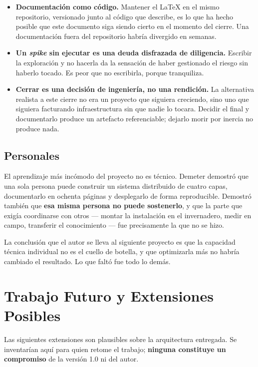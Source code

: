 \begin{itemize}[leftmargin=*, label=--]
    \item \textbf{Documentación como código.} Mantener el LaTeX en el mismo
          repositorio, versionado junto al código que describe, es lo que ha hecho
          posible que este documento siga siendo cierto en el momento del cierre.
          Una documentación fuera del repositorio habría divergido en semanas.
    \item \textbf{Un \textit{spike} sin ejecutar es una deuda disfrazada de
          diligencia.} Escribir la exploración y no hacerla da la sensación de
          haber gestionado el riesgo sin haberlo tocado. Es peor que no escribirla,
          porque tranquiliza.
    \item \textbf{Cerrar es una decisión de ingeniería, no una rendición.} La
          alternativa realista a este cierre no era un proyecto que siguiera
          creciendo, sino uno que siguiera facturando infraestructura sin que nadie
          lo tocara. Decidir el final y documentarlo produce un artefacto
          referenciable; dejarlo morir por inercia no produce nada.
\end{itemize}

\subsection*{Personales}

El aprendizaje más incómodo del proyecto no es técnico. Demeter demostró que una
sola persona puede construir un sistema distribuido de cuatro capas, documentarlo
en ochenta páginas y desplegarlo de forma reproducible. Demostró también que \textbf{esa
misma persona no puede sostenerlo}, y que la parte que exigía coordinarse con
otros --- montar la instalación en el invernadero, medir en campo, transferir el
conocimiento --- fue precisamente la que no se hizo.

La conclusión que el autor se lleva al siguiente proyecto es que la capacidad
técnica individual no es el cuello de botella, y que optimizarla más no habría
cambiado el resultado. Lo que faltó fue todo lo demás.

\section{Trabajo Futuro y Extensiones Posibles}

Las siguientes extensiones son plausibles sobre la arquitectura entregada. Se
inventarían aquí para quien retome el trabajo; \textbf{ninguna constituye un
compromiso} de la versión 1.0 ni del autor.


